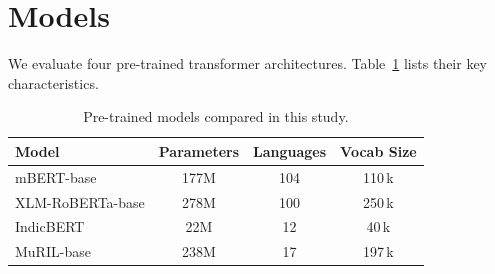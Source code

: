 \section{Models}

We evaluate four pre-trained transformer architectures. Table~\ref{tab:models} lists their key characteristics.

\begin{table}[htbp]
\centering
\caption{Pre-trained models compared in this study.}
\label{tab:models}
\begin{tabular}{@{}lccc@{}}
\toprule
\textbf{Model}    & \textbf{Parameters} & \textbf{Languages} & \textbf{Vocab Size} \\
\midrule
mBERT-base        & 177M & 104 & 110\,k \\
XLM-RoBERTa-base  & 278M & 100 & 250\,k \\
IndicBERT         &  22M &  12 &  40\,k \\
MuRIL-base        & 238M &  17 & 197\,k \\
\bottomrule
\end{tabular}
\end{table}
